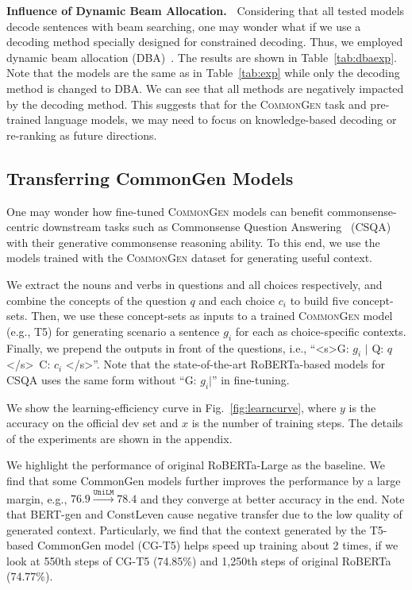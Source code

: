 \documentclass[11pt,a4paper]{article}
\begin{document}
\noindent
 \textbf{Influence of Dynamic Beam Allocation.~}
Considering that all tested models decode sentences with beam searching, one may wonder what if we use a decoding method specially designed for constrained decoding.
 Thus, we employed dynamic beam allocation (DBA)~\cite{post-vilar-2018-fast}.
 The results are shown in Table~\ref{tab:dbaexp}.
 Note that the models are the same as in Table~\ref{tab:exp} while only the decoding method is changed to DBA.
 We can see that all methods are negatively impacted by the decoding method.
 This suggests that for the \textsc{CommonGen} task and pre-trained language models, we may need to focus on knowledge-based decoding or re-ranking as future directions.
	
    \subsection{Transferring CommonGen Models}
    \label{ssec:transfer}
    One may wonder how fine-tuned \textsc{CommonGen} models can benefit commonsense-centric downstream tasks such as Commonsense Question Answering~\cite{Talmor2018CommonsenseQAAQ} (CSQA) with their generative commonsense reasoning ability.
    To this end, we use the models trained with the \textsc{CommonGen} dataset for generating useful context. 


    We extract the nouns and verbs in questions and all choices respectively, and combine the concepts of the question $q$ and each choice $c_i$ to build five concept-sets. 
    Then, we use these concept-sets as inputs to a trained \textsc{CommonGen} model (e.g., T5) for generating scenario a sentence $g_i$ for each as choice-specific contexts.
    Finally, we prepend the outputs in front of the questions, i.e., ``\textless s\textgreater G: $g_i$ $|$ Q: $q$ \textless /s\textgreater~C: $c_i$ \textless /s\textgreater ''. Note that the  state-of-the-art RoBERTa-based models for CSQA uses the same form without ``G: $g_i|$'' in fine-tuning.
   
    
    We show the learning-efficiency curve in Fig.~\ref{fig:learncurve}, where $y$ is the accuracy on the official dev set and $x$ is the number of training steps.
    The details of the experiments are shown in the appendix.


    We highlight the performance of original RoBERTa-Large as the baseline.
    We find that some CommonGen models further improves the performance by a large margin, e.g., $76.9 \xrightarrow{\texttt{UniLM}} 78.4$ and they converge at better accuracy in the end. Note that BERT-gen and ConstLeven cause negative transfer due to the low quality of generated context. 
    Particularly, we find that the context generated by the T5-based CommonGen model (CG-T5) helps speed up training about 2 times, if we look at 550th steps of CG-T5 (74.85\%) and 1,250th steps of original RoBERTa (74.77\%).
	
\end{document}
